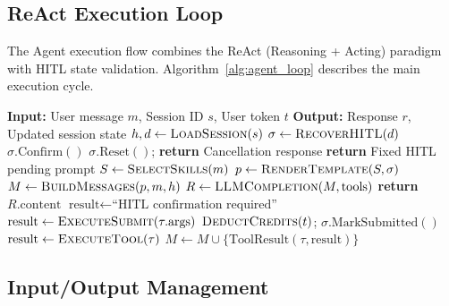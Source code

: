 \subsection{ReAct Execution Loop}

The Agent execution flow combines the ReAct (Reasoning + Acting) paradigm with HITL state validation. Algorithm~\ref{alg:agent_loop} describes the main execution cycle.

\begin{algorithm}[htbp]
	\caption{Agent ReAct + HITL Execution Loop}
	\label{alg:agent_loop}
	\begin{algorithmic}[1]
		\STATE \textbf{Input:} User message $m$, Session ID $s$, User token $t$
		\STATE \textbf{Output:} Response $r$, Updated session state
		\STATE $h, d \gets \textsc{LoadSession}(s)$ 
		\STATE $\sigma \gets \textsc{RecoverHITL}(d)$ 
		\STATE $\sigma.\text{Confirm}()$
		\STATE $\sigma.\text{Reset}()$; \textbf{return} Cancellation response
		\ELSE
		\STATE \textbf{return} Fixed HITL pending prompt 
		\ENDIF
		\ENDIF
		\STATE $S \gets \textsc{SelectSkills}(m)$ 
		\STATE $p \gets \textsc{RenderTemplate}(S, \sigma)$ 
		\STATE $M \gets \textsc{BuildMessages}(p, m, h)$
		\STATE $R \gets \textsc{LLMCompletion}(M, \text{tools})$
		\STATE \textbf{return} $R.\text{content}$ 
		\ENDIF
		\STATE $\text{result} \gets \text{``HITL confirmation required''}$
		\ELSE
		\STATE $\text{result} \gets \textsc{ExecuteSubmit}(\tau.\text{args})$
		\STATE $\textsc{DeductCredits}(t)$; $\sigma.\text{MarkSubmitted}()$
		\ENDIF
		\ENDIF
		\ELSE
		\STATE $\text{result} \gets \textsc{ExecuteTool}(\tau)$
		\ENDIF
		\STATE $M \gets M \cup \{\text{ToolResult}(\tau, \text{result})\}$
		\ENDFOR
		\ENDFOR
	\end{algorithmic}
\end{algorithm}

\subsection{Input/Output Management}


